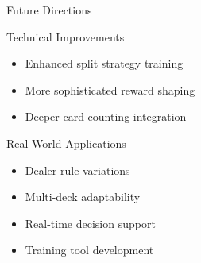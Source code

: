 \documentclass{beamer}
\begin{document}
\begin{frame}{Future Directions}
    \begin{block}{Technical Improvements}
        \begin{itemize}
            \item Enhanced split strategy training
            \item More sophisticated reward shaping
            \item Deeper card counting integration
        \end{itemize}
    \end{block}
    
    \begin{block}{Real-World Applications}
        \begin{itemize}
            \item Dealer rule variations
            \item Multi-deck adaptability
            \item Real-time decision support
            \item Training tool development
        \end{itemize}
    \end{block}
\end{frame}
\end{document}
